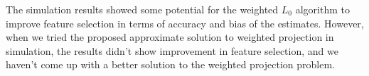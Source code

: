 The simulation results showed some potential for the weighted $L_0$ algorithm to improve feature selection in terms of accuracy and bias of the estimates. However, when we tried the proposed approximate solution to weighted projection in simulation, the results didn't show improvement in feature selection, and we haven't come up with a better solution to the weighted projection problem. 

